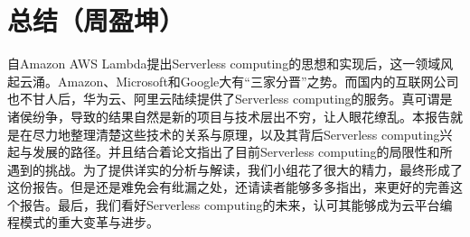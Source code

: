 \section{总结（周盈坤）}
自Amazon AWS Lambda提出Serverless computing的思想和实现后，这一领域风起云涌。Amazon、Microsoft和Google大有``三家分晋''之势。而国内的互联网公司也不甘人后，华为云、阿里云陆续提供了Serverless computing的服务。真可谓是诸侯纷争，导致的结果自然是新的项目与技术层出不穷，让人眼花缭乱。本报告就是在尽力地整理清楚这些技术的关系与原理，以及其背后Serverless computing兴起与发展的路径。并且结合着论文指出了目前Serverless computing的局限性和所遇到的挑战。为了提供详实的分析与解读，我们小组花了很大的精力，最终形成了这份报告。但是还是难免会有纰漏之处，还请读者能够多多指出，来更好的完善这个报告。最后，我们看好Serverless computing的未来，认可其能够成为云平台编程模式的重大变革与进步。